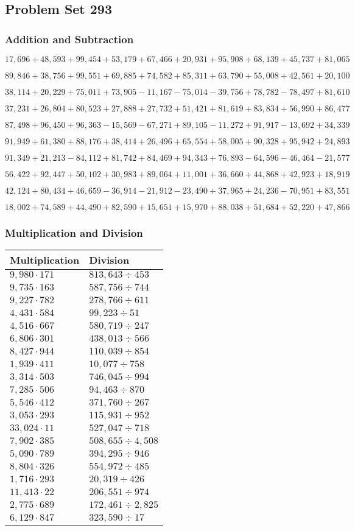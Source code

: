 \hypertarget{problem-set-293}{%
\subsection{Problem Set 293}\label{problem-set-293}}

\hypertarget{addition-and-subtraction}{%
\subsubsection{Addition and
Subtraction}\label{addition-and-subtraction}}

\(17,696+48,593+99,454+53,179+67,466+20,931+95,908+68,139+45,737+81,065\)

\(89,846+38,756+99,551+69,885+74,582+85,311+63,790+55,008+42,561+20,100\)

\(38,114+20,229+75,011+73,905-11,167-75,014-39,756+78,782-78,497+81,610\)

\(37,231+26,804+80,523+27,888+27,732+51,421+81,619+83,834+56,990+86,477\)

\(87,498+96,450+96,363-15,569-67,271+89,105-11,272+91,917-13,692+34,339\)

\(91,949+61,380+88,176+38,414+26,496+65,554+58,005+90,328+95,942+24,893\)

\(91,349+21,213-84,112+81,742+84,469+94,343+76,893-64,596-46,464-21,577\)

\(56,422+92,447+50,102+30,983+89,064+11,001+36,660+44,868+42,923+18,919\)

\(42,124+80,434+46,659-36,914-21,912-23,490+37,965+24,236-70,951+83,551\)

\(18,002+74,589+44,490+82,590+15,651+15,970+88,038+51,684+52,220+47,866\)

\hypertarget{multiplication-and-division}{%
\subsubsection{Multiplication and
Division}\label{multiplication-and-division}}

\begin{longtable}[]{@{}ll@{}}
\toprule
Multiplication & Division\tabularnewline
\midrule
\endhead
\(9,980\cdot171\) & \(813,643÷453\)\tabularnewline
\(9,735\cdot163\) & \(587,756÷744\)\tabularnewline
\(9,227\cdot782\) & \(278,766÷611\)\tabularnewline
\(4,431\cdot584\) & \(99,223÷51\)\tabularnewline
\(4,516\cdot667\) & \(580,719÷247\)\tabularnewline
\(6,806\cdot301\) & \(438,013÷566\)\tabularnewline
\(8,427\cdot944\) & \(110,039÷854\)\tabularnewline
\(1,939\cdot411\) & \(10,077÷758\)\tabularnewline
\(3,314\cdot503\) & \(746,045÷994\)\tabularnewline
\(7,285\cdot506\) & \(94,463÷870\)\tabularnewline
\(5,546\cdot412\) & \(371,760÷267\)\tabularnewline
\(3,053\cdot293\) & \(115,931÷952\)\tabularnewline
\(33,024\cdot11\) & \(527,047÷718\)\tabularnewline
\(7,902\cdot385\) & \(508,655÷4,508\)\tabularnewline
\(5,090\cdot789\) & \(394,295÷946\)\tabularnewline
\(8,804\cdot326\) & \(554,972÷485\)\tabularnewline
\(1,716\cdot293\) & \(20,319÷426\)\tabularnewline
\(11,413\cdot22\) & \(206,551÷974\)\tabularnewline
\(2,775\cdot689\) & \(172,461÷2,825\)\tabularnewline
\(6,129\cdot847\) & \(323,590÷17\)\tabularnewline
\bottomrule
\end{longtable}
